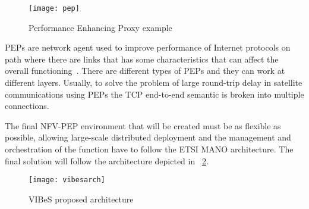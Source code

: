 \begin{figure}[ht]
  \centering
  \texttt{[image: pep]}
  \caption[Performance Enhancing Proxy example]{Performance Enhancing Proxy
  example}
  \label{chap:background:img:pep}
\end{figure}

PEPs are network agent used to improve performance of Internet protocols on path
where there are links that has some characteristics that can affect the overall
functioning~\cite{border2001rfc3135}. There are different types of PEPs and
they can work at different layers. Usually, to solve the problem of large
round-trip delay in satellite communications using PEPs the TCP end-to-end
semantic is broken into multiple connections.

The final NFV-PEP environment that will be created must be as flexible as
possible, allowing large-scale distributed deployment and the
management and orchestration of the function have to follow the ETSI MANO
architecture. The final solution will follow the architecture depicted in~
\ref{chap:background:img:vibesarch}.

\begin{figure}[h]
  \centering
  \texttt{[image: vibesarch]}
  \caption[VIBeS proposed architecture]{VIBeS proposed
  architecture~\cite{vibesesa}}
  \label{chap:background:img:vibesarch}
\end{figure}